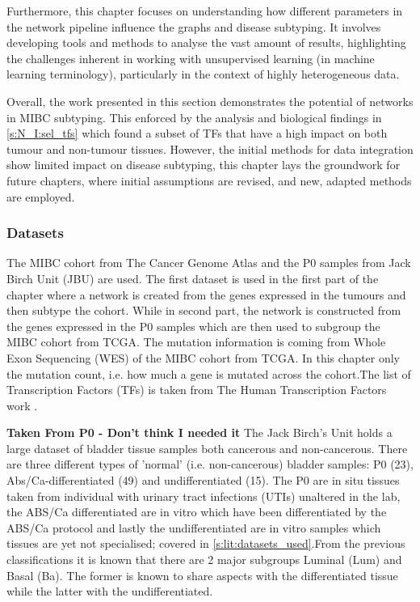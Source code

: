 Furthermore, this chapter focuses on understanding how different parameters in the network pipeline influence the graphs and disease subtyping. It involves developing tools and methods to analyse the vast amount of results, highlighting the challenges inherent in working with unsupervised learning (in machine learning terminology), particularly in the context of highly heterogeneous data.

Overall, the work presented in this section demonstrates the potential of networks in MIBC subtyping. This enforced by the analysis and biological findings in \cref{s:N_I:sel_tfs} which found a subset of TFs that have a high impact on both tumour and non-tumour tissues. However, the initial methods for data integration show limited impact on disease subtyping, this chapter lays the groundwork for future chapters, where initial assumptions are revised, and new, adapted methods are employed.

\subsubsection*{Datasets}

The MIBC cohort from The Cancer Genome Atlas \cite{Robertson2017-mg} and the P0 samples from Jack Birch Unit (JBU) are used. The first dataset is used in the first part of the chapter where a network is created from the genes expressed in the tumours and then subtype the cohort. While in second part, the network is constructed from the genes expressed in the P0 samples which are then used to subgroup the MIBC cohort from TCGA. The mutation information is coming from Whole Exon Sequencing (WES) of the MIBC cohort from TCGA. In this chapter only the mutation count, i.e. how much a gene is mutated across the cohort.The list of Transcription Factors (TFs) is taken from The Human Transcription Factors work \citet{Lambert2018-el}.

\textbf{Taken From P0 - Don't think I needed it}
The Jack Birch's Unit holds a large dataset of bladder tissue samples both cancerous and non-cancerous. There are three different types of 'normal'  (i.e. non-cancerous) bladder samples: P0 (23), Abs/Ca-differentiated (49) and undifferentiated (15). The P0 are in situ tissues taken from individual with urinary tract infections (UTIs) unaltered in the lab, the ABS/Ca differentiated are in vitro which have been differentiated by the ABS/Ca protocol and lastly the undifferentiated are in vitro samples which tissues are yet not specialised; covered in \cref{s:lit:datasets_used}.From the previous classifications \citet{Robertson2017-mg, Kamoun2020-tj} it is known that there are 2 major subgroups Luminal (Lum) and Basal (Ba). The former is known to share aspects with the differentiated tissue while the latter with the undifferentiated. 

